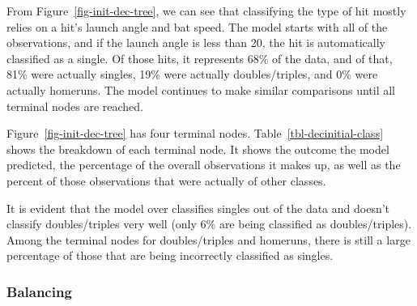 \documentclass[
  letterpaper,
  DIV=11,
  numbers=noendperiod]{scrartcl}
\begin{document}
From Figure~\ref{fig-init-dec-tree}, we can see that classifying the
type of hit mostly relies on a hit's launch angle and bat speed. The
model starts with all of the observations, and if the launch angle is
less than 20, the hit is automatically classified as a single. Of those
hits, it represents 68\% of the data, and of that, 81\% were actually
singles, 19\% were actually doubles/triples, and 0\% were actually
homeruns. The model continues to make similar comparisons until all
terminal nodes are reached.

Figure~\ref{fig-init-dec-tree} has four terminal nodes.
Table~\ref{tbl-decinitial-class} shows the breakdown of each terminal
node. It shows the outcome the model predicted, the percentage of the
overall observations it makes up, as well as the percent of those
observations that were actually of other classes.

\begin{table}

\caption{\label{tbl-decinitial-class}Results of stage 1 decision tree
classification for the initial model}


\end{table}%

It is evident that the model over classifies singles out of the data and
doesn't classify doubles/triples very well (only 6\% are being
classified as doubles/triples). Among the terminal nodes for
doubles/triples and homeruns, there is still a large percentage of those
that are being incorrectly classified as singles.

\subsubsection{Balancing}\label{balancing}
\end{document}
